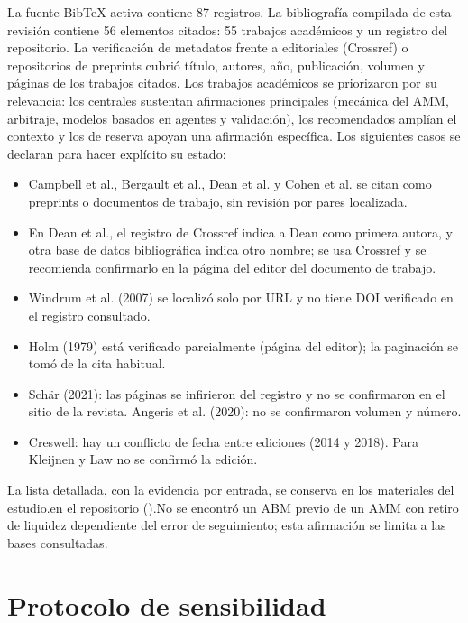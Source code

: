La fuente BibTeX activa contiene 87 registros. La bibliografía compilada de esta revisión contiene 56 elementos citados: 55 trabajos académicos y un registro del repositorio. La verificación de metadatos frente a editoriales (Crossref) o repositorios de preprints cubrió título, autores, año, publicación, volumen y páginas de los trabajos citados. Los trabajos académicos se priorizaron por su relevancia: los centrales sustentan afirmaciones principales (mecánica del AMM, arbitraje, modelos basados en agentes y validación), los recomendados amplían el contexto y los de reserva apoyan una afirmación específica. Los siguientes casos se declaran para hacer explícito su estado:

\begin{itemize}
  \item Campbell et al., Bergault et al., Dean et al. y Cohen et al. se citan como preprints o documentos de trabajo, sin revisión por pares localizada.
  \item En Dean et al., el registro de Crossref indica a Dean como primera autora, y otra base de datos bibliográfica indica otro nombre; se usa Crossref y se recomienda confirmarlo en la página del editor del documento de trabajo.
  \item Windrum et al. (2007) se localizó solo por URL y no tiene DOI verificado en el registro consultado.
  \item Holm (1979) está verificado parcialmente (página del editor); la paginación se tomó de la cita habitual.
  \item Schär (2021): las páginas se infirieron del registro y no se confirmaron en el sitio de la revista. Angeris et al. (2020): no se confirmaron volumen y número.
  \item Creswell: hay un conflicto de fecha entre ediciones (2014 y 2018). Para Kleijnen y Law no se confirmó la edición.
\end{itemize}

La lista detallada, con la evidencia por entrada, se conserva \ifdefined\blindreviewmode en los materiales del estudio.\else en el repositorio ().\fi No se encontró un ABM previo de un AMM con retiro de liquidez dependiente del error de seguimiento; esta afirmación se limita a las bases consultadas.

\section{Protocolo de sensibilidad}
\label{sec:sensibilidad}

